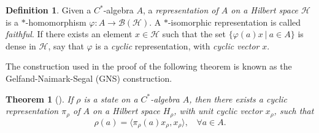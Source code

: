 \documentclass[12pt,a4paper]{report}
\theoremstyle{plain}
\newtheorem{thm}{Theorem}
\theoremstyle{definition}
\newtheorem{defn}{Definition}
\newcommand{\1}{\mathbbm{1}}
\renewcommand{\H}{\mathcal{H}}
\newcommand{\B}{\mathcal{B}}
\newcommand{\BH}{\mathcal{\B(\H)}}
\renewcommand{\phi}{\varphi}
\begin{document}
\begin{defn}
	Given a $C^\ast$-algebra $A$, a \emph{representation of $A$ on a Hilbert space $\H$} 
	is a $\ast$-homomorphism $\phi: A \to \BH$. 
	A $\ast$-isomorphic representation is called \emph{faithful}.
	If there exists an element $x\in\H$ such that the set $\{\phi(a)x ~|~ a\in A\}$ is dense in $\H$, 
	say that $\phi$ is a \emph{cyclic} representation, with \emph{cyclic vector} $x$.
\end{defn}	
The construction used in the proof of the following theorem is known as the Gelfand-Naimark-Segal (GNS)
construction.
\begin{thm}[{\cite[4.5.2]{kadison83}}]
	If $\rho$ is a state on a $C^\ast$-algebra $A$, then there exists a cyclic representation 
	$\pi_\rho$ of $A$ on a Hilbert space ${H}_\rho$, with unit cyclic vector $x_\rho$, such that 
	\[ 
		\rho(a)= \langle \pi_\rho (a) x_\rho, x_\rho \rangle, ~~~~ \forall a \in A.
	\]
\end{thm}
\end{document}
